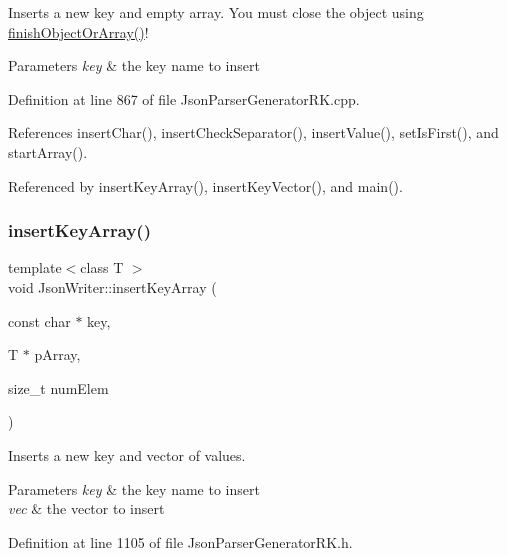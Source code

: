 Inserts a new key and empty array. You must close the object using \hyperlink{class_json_writer_adbd96b46b0679bea3a066c0e62bd86b0}{finish\+Object\+Or\+Array()}! 


\begin{DoxyParams}{Parameters}
{\em key} & the key name to insert \\
\hline
\end{DoxyParams}


Definition at line 867 of file Json\+Parser\+Generator\+R\+K.\+cpp.



References insert\+Char(), insert\+Check\+Separator(), insert\+Value(), set\+Is\+First(), and start\+Array().



Referenced by insert\+Key\+Array(), insert\+Key\+Vector(), and main().

\mbox{\label{class_json_writer_a8e0dbff82335aab801d541583fe6c48c}} 
\subsubsection{\texorpdfstring{insert\+Key\+Array()}{insertKeyArray()}\hspace{0.1cm}{\footnotesize\ttfamily [2/2]}}
{\footnotesize\ttfamily template$<$class T $>$ \\
void Json\+Writer\+::insert\+Key\+Array (\begin{DoxyParamCaption}\item[{const char $\ast$}]{key,  }\item[{T $\ast$}]{p\+Array,  }\item[{size\+\_\+t}]{num\+Elem }\end{DoxyParamCaption})\hspace{0.3cm}{\ttfamily [inline]}}



Inserts a new key and vector of values. 


\begin{DoxyParams}{Parameters}
{\em key} & the key name to insert\\
\hline
{\em vec} & the vector to insert \\
\hline
\end{DoxyParams}


Definition at line 1105 of file Json\+Parser\+Generator\+R\+K.\+h.



